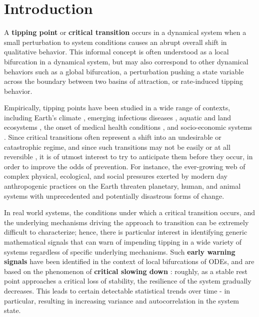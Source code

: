 \section{Introduction}
\label{sec:intro}

A \textbf{tipping point} or \textbf{critical transition} occurs in a dynamical system when a small perturbation to system conditions causes an abrupt overall shift in qualitative behavior. This informal concept is often understood as a local bifurcation in a dynamical system, but may also correspond to other dynamical behaviors such as a global bifurcation, a perturbation pushing a state variable across the boundary between two basins of attraction, or rate-induced tipping behavior. 

Empirically, tipping points have been studied in a wide range of contexts, including Earth's climate \cite{lentonTippingElementsEarth2008, dakosSlowingEarlyWarning2008a}, emerging infectious diseases \cite{brettDynamicalFootprintsEnable2020}, aquatic and land ecosystems \cite{schefferCatastrophicShiftsEcosystems2001a, carpenterRisingVarianceLeading2006}, the onset of medical health conditions \cite{mcsharryPredictionEpilepticSeizures2003, venegasSelforganizedPatchinessAsthma2005}, and socio-economic systems \cite{ginkelClimateChangeInduced2020}. Since critical transitions often represent a shift into an undesirable or catastrophic regime, and since such transitions may not be easily or at all reversible \cite{albrichClimateChangeCauses2020, chenImperfectVaccineHysteresis2019, lucariniThermodynamicAnalysisSnowball2010}, it is of utmost interest to try to anticipate them before they occur, in order to improve the odds of prevention. For instance, the ever-growing web of complex physical, ecological, and social pressures exerted by modern day anthropogenic practices on the Earth threaten planetary, human, and animal systems with unprecedented and potentially disastrous forms of change. 

In real world systems, the conditions under which a critical transition occurs, and the underlying mechanisms driving the approach to transition can be extremely difficult to characterize; hence, there is particular interest in identifying generic mathematical signals that can warn of impending tipping in a wide variety of systems regardless of specific underlying mechanisms. Such \textbf{early warning signals} have been identified in the context of local bifurcations of ODEs, and are based on the phenomenon of \textbf{critical slowing down} \cite{schefferEarlywarningSignalsCritical2009a}: roughly, as a stable rest point approaches a critical loss of stability, the resilience of the system gradually decreases. This leads to certain detectable statistical trends over time - in particular, resulting in increasing variance and autocorrelation in the system state. 




